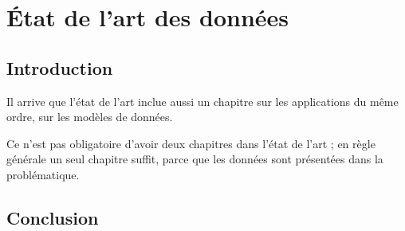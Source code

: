 \chapter{État de l'art des données}
\minitoc
\newpage

\section{Introduction}

Il arrive que l'état de l'art inclue aussi un chapitre sur les applications du même ordre, sur les modèles de données.

Ce n'est pas obligatoire d'avoir deux chapitres dans l'état de l'art ; en règle générale un seul chapitre suffit, parce que les données sont présentées dans la problématique.

\section{Conclusion}